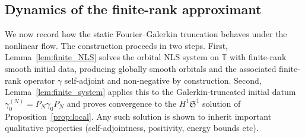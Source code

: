 \documentclass[11pt]{amsart}
\theoremstyle{definition}
\newtheorem{remark}[theorem]{Remark}
\newcommand{\T}{\mathbb{T}}
\newcommand{\Sp}{\mathfrak{S}}
\begin{document}
%
%

\subsection{Dynamics of the finite-rank approximant}
\label{subsec:galerkin_dynamic}

We now record how the static Fourier--Galerkin truncation behaves under the nonlinear flow. The construction proceeds in two steps. First, Lemma~\ref{lem:finite_NLS} solves the orbital NLS system on $\T$ with finite-rank smooth initial data, producing globally smooth orbitals and the associated finite-rank operator $\gamma$ self-adjoint and non-negative by construction. Second, Lemma~\ref{lem:finite_system} applies this to the Galerkin-truncated initial datum $\gamma_0^{(N)}=P_N\gamma_0 P_N$ and proves convergence to the $H^1\Sp^1$ solution of Proposition~\ref{prop:local}. Any such solution is shown to inherit  important qualitative properties (self-adjointness, positivity, energy bounds etc).
\end{document}

